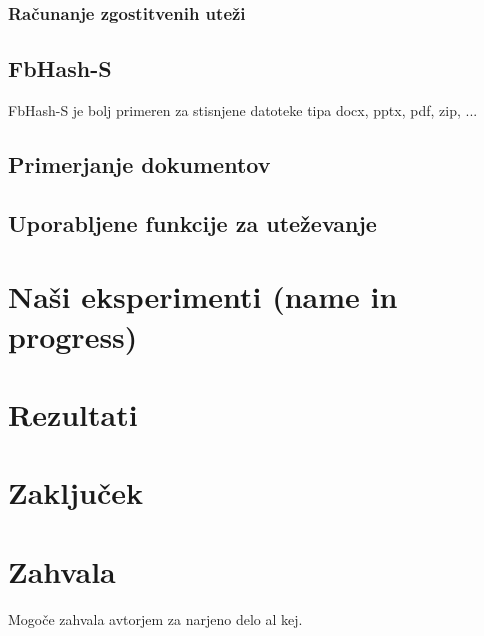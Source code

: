 \documentclass{acm_proc_article-sp}
\begin{document}
\subsubsection{Računanje zgostitvenih uteži}

\subsection{FbHash-S}

FbHash-S je bolj primeren za stisnjene datoteke tipa docx, pptx, pdf, zip, ...

\subsection{Primerjanje dokumentov}

\subsection{Uporabljene funkcije za uteževanje}
\label{weight-functions}

\section{Na\v{s}i eksperimenti (name in progress)}

\section{Rezultati}

\section{Zaklju\v{c}ek}

\section{Zahvala}
Mogoče zahvala avtorjem za narjeno delo al kej.




\balancecolumns
\end{document}
